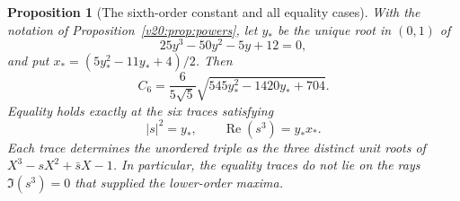 \documentclass[UTF8,11pt]{ctexart}
\newtheorem{prop}[thm]{Proposition}
\theoremstyle{definition}
\numberwithin{equation}{section}
\DeclareMathOperator{\Rea}{Re}\DeclareMathOperator{\Ima}{Im}
\begin{document}
\begin{prop}[The sixth-order constant and all equality cases]
\label{v24:prop:sixthpower}
With the notation of Proposition~\ref{v20:prop:powers}, let $y_*$
be the unique root in $(0,1)$ of
\begin{equation}\label{v24:eq:cubic}
                    25y^3-50y^2-5y+12=0,
\end{equation}
and put $x_*=(5y_*^2-11y_*+4)/2$. Then
\begin{equation}\label{v24:eq:C6}
 C_6=\frac{6}{5\sqrt5}
            \sqrt{545y_*^2-1420y_*+704}.
\end{equation}
Equality holds exactly at the six traces satisfying
\begin{equation}\label{v24:eq:equality}
                 |s|^2=y_*,\qquad \Rea(s^3)=y_*x_*.
\end{equation}
Each trace determines the unordered triple as the three distinct
unit roots of $X^3-sX^2+\bar sX-1$.
In particular, the equality traces do not lie on the rays
$\Im(s^3)=0$ that supplied the lower-order maxima.
\end{prop}
\end{document}
